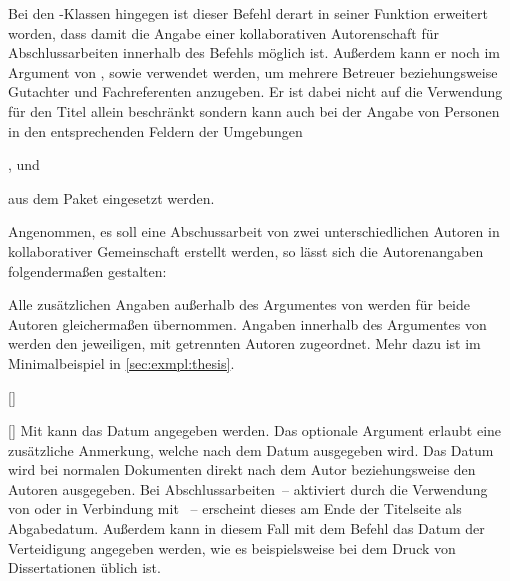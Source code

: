 \begin{Declaration*}{}
\begin{Declaration*}{}
\begin{Declaration*}{}
\begin{Declaration}{}
Bei den \TUDScript-Klassen hingegen ist dieser Befehl derart in seiner Funktion 
erweitert worden, dass damit die Angabe einer kollaborativen Autorenschaft für 
Abschlussarbeiten innerhalb des Befehls  möglich ist. Außerdem 
kann er noch im Argument von ,  sowie 
 verwendet werden, um mehrere Betreuer beziehungsweise Gutachter 
und Fachreferenten anzugeben. Er ist dabei nicht auf die Verwendung für den 
Titel allein beschränkt sondern kann auch bei der Angabe von Personen in den 
entsprechenden Feldern der Umgebungen
\begin{Bundle}{}
,  und 
\end{Bundle}
aus dem Paket  eingesetzt werden.
\end{Declaration}
%
\begin{Example}
Angenommen, es soll eine Abschussarbeit von zwei unterschiedlichen Autoren in 
kollaborativer Gemeinschaft erstellt werden, so lässt sich die Autorenangaben 
folgendermaßen gestalten:
\begin{Code}
\author{%
  Mickey Mouse
\and%
  Donald Duck
}
\end{Code}
Alle zusätzlichen Angaben außerhalb des Argumentes von  werden 
für beide Autoren gleichermaßen übernommen. Angaben innerhalb des Argumentes 
von  werden den jeweiligen, mit  getrennten Autoren 
zugeordnet. Mehr dazu ist im Minimalbeispiel in \autoref{sec:exmpl:thesis}.
\end{Example}

\begin{Declaration}{[]}
\begin{Declaration}{[]}
\printdeclarationlist%
%
%
%
%
Mit  kann das Datum angegeben werden. Das optionale Argument 
erlaubt eine zusätzliche Anmerkung, welche nach dem Datum ausgegeben wird. Das 
Datum wird bei normalen Dokumenten direkt nach dem Autor beziehungsweise den 
Autoren ausgegeben. Bei Abschlussarbeiten~-- aktiviert durch die Verwendung von 
 oder  in Verbindung mit ~-- 
erscheint dieses am Ende der Titelseite als Abgabedatum. Außerdem kann in 
diesem Fall mit dem Befehl das Datum der Verteidigung 
angegeben werden, wie es beispielsweise bei dem Druck von Dissertationen üblich 
ist.


\end{Declaration}
\end{Declaration}
\end{Declaration*}
\end{Declaration*}
\end{Declaration*}
